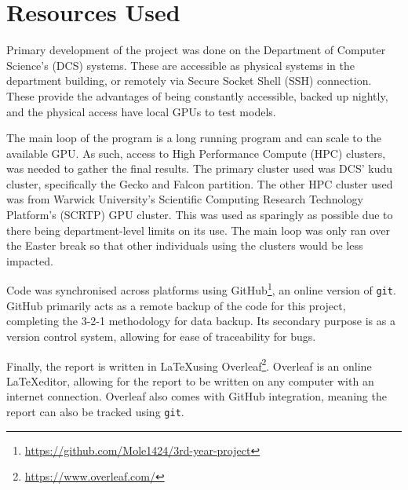 \section{Resources Used}


Primary development of the project was done on the Department of Computer Science's (DCS) systems. These are accessible as physical systems in the department building, or remotely via Secure Socket Shell (SSH) connection. These provide the advantages of being constantly accessible, backed up nightly, and the physical access have local GPUs to test models.

The main loop of the program is a long running program and can scale to the available GPU. As such, access to High Performance Compute (HPC) clusters, was needed to gather the final results. The primary cluster used was DCS' kudu cluster, specifically the Gecko and Falcon partition. The other HPC cluster used was from Warwick University's Scientific Computing Research Technology Platform's (SCRTP) GPU cluster. This was used as sparingly as possible due to there being department-level limits on its use. The main loop was only ran over the Easter break so that other individuals using the clusters would be less impacted.

Code was synchronised across platforms using GitHub\footnote{\url{https://github.com/Mole1424/3rd-year-project}}, an online version of \verb|git|. GitHub primarily acts as a remote backup of the code for this project, completing the 3-2-1 methodology for data backup\cite{seagate321}. Its secondary purpose is as a version control system, allowing for ease of traceability for bugs.

Finally, the report is written in \LaTeX using Overleaf\footnote{\url{https://www.overleaf.com/}}. Overleaf is an online \LaTeX editor, allowing for the report to be written on any computer with an internet connection. Overleaf also comes with GitHub integration, meaning the report can also be tracked using \verb|git|.

